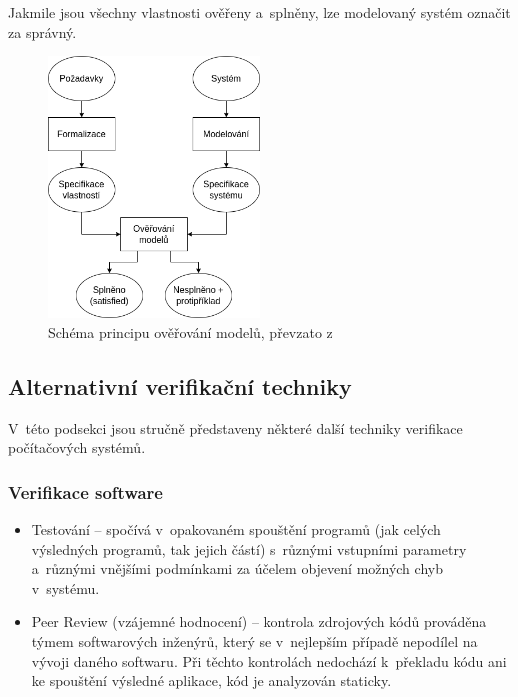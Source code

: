 Jakmile jsou všechny vlastnosti ověřeny a~splněny, lze modelovaný systém označit za správný.

\begin{figure}[H]
    \centering
    \includegraphics[width=0.5\textwidth]{obrazky-figures/model_checking_scheme.png}
    \caption{Schéma principu ověřování modelů, převzato z~\cite{quantitative_analysis}}
    \label{fig:mc_scheme}
\end{figure}

\subsection{Alternativní verifikační techniky}
V~této podsekci jsou stručně představeny některé další techniky verifikace počítačových systémů.

\subsubsection{Verifikace software}
\begin{itemize}
    \item Testování -- spočívá v~opakovaném spouštění programů (jak celých výsledných programů, tak jejich částí) s~různými vstupními parametry a~různými vnějšími podmínkami za účelem objevení možných chyb v~systému.
    \item Peer Review (vzájemné hodnocení) -- kontrola zdrojových kódů prováděna týmem softwarových inženýrů, který se v~nejlepším případě nepodílel na vývoji daného softwaru. Při těchto kontrolách nedochází k~překladu kódu ani ke spouštění výsledné aplikace, kód je analyzován staticky.
\end{itemize}

